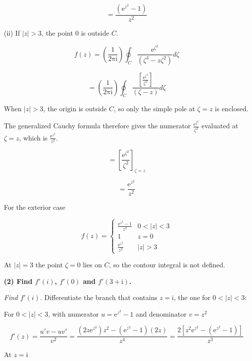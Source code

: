 \documentclass[11pt,a4paper]{article}
\theoremstyle{definition}
\theoremstyle{plain}
\begin{document}
\[
= \frac{(\mathrm{e}^{z^{2}} - 1)}{z^{2}}
\]

(ii) If $\vert{}z\vert{} > 3$, the point 0 is outside $C$.

\begin{equation}
f(z) = \left(\frac{1}{2\mathrm{\pi}\mathrm{i}}\right)\oint_{C}\frac{\mathrm{e}^{\zeta^{2}}}{(\zeta^{3} - z\zeta^{2})}d\zeta
\end{equation}

\[
= \left(\frac{1}{2\mathrm{\pi}\mathrm{i}}\right)\oint_{C}\frac{[\frac{\mathrm{e}^{\zeta^{2}}}{\zeta^{2}}]}{(\zeta - z)}d\zeta
\]

When $\vert{}z\vert{} > 3$, the origin is outside $C$, so only the simple pole at $\zeta = z$ is enclosed.

The generalized Cauchy formula therefore gives the numerator $\frac{\mathrm{e}^{\zeta^{2}}}{\zeta^{2}}$ evaluated at $\zeta = z$, which is $\frac{\mathrm{e}^{z^{2}}}{z^{2}}$.

\[
= {[\frac{\mathrm{e}^{\zeta^{2}}}{\zeta^{2}}]}_{\zeta = z}
\]

\[
= \frac{\mathrm{e}^{z^{2}}}{z^{2}}
\]

For the exterior case

\begin{equation}
f(z) = \begin{cases} \frac{\mathrm{e}^{z^{2}} - 1}{z^{2}} & 0 < \vert{}z\vert{} < 3 \\ 1 & z = 0 \\ \frac{\mathrm{e}^{z^{2}}}{z^{2}} & \vert{}z\vert{} > 3 \end{cases}
\end{equation}

At $\vert{}z\vert{} = 3$ the point $\zeta = 0$ lies on $C$, so the contour integral is not defined.

\textbf{(2) Find $f'(i)$, $f'(0)$ and $f'(3 + \mathrm{i})$.}

\textit{Find $f'(i)$.} Differentiate the branch that contains $z = \mathrm{i}$, the one for $0 < \vert{}z\vert{} < 3$:

For $0 < \vert{}z\vert{} < 3$, with numerator $u = \mathrm{e}^{z^{2}} - 1$ and denominator $v = z^{2}$



$$ f'(z) = \frac{u'v - uv'}{v^{2}} = \frac{(2z\mathrm{e}^{z^{2}})z^{2} - (\mathrm{e}^{z^{2}} - 1)(2z)}{z^{4}} = \frac{2[z^{2}\mathrm{e}^{z^{2}} - (\mathrm{e}^{z^{2}} - 1)]}{z^{3}}$$

At $z = \mathrm{i}$
\end{document}
